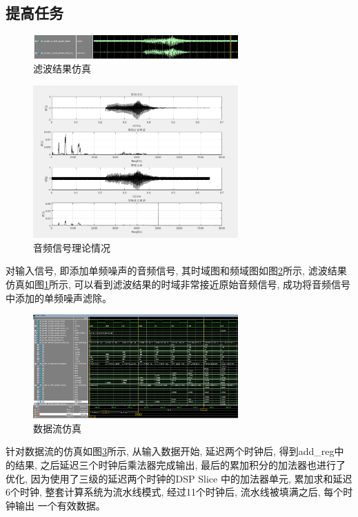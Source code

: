 \documentclass{article}
\begin{document}
\subsection*{提高任务}
\begin{figure}[H]
    \centering
    \includegraphics[width=0.7\textwidth]{image/2024-06-26-20-09-26.png}
    \caption{滤波结果仿真}
    \label{image_improve_sim_1_1}
\end{figure}
\begin{figure}[H]
    \centering
    \includegraphics[width=0.7\textwidth]{image/2024-06-26-20-11-58.png}
    \caption{音频信号理论情况}
    \label{image_improve_sim_1_2}
\end{figure}
对输入信号, 即添加单频噪声的音频信号, 其时域图和频域图如图\ref{image_improve_sim_1_2}所示, 
滤波结果仿真如图\ref{image_improve_sim_1_1}所示, 可以看到滤波结果的时域非常接近原始音频信号, 
成功将音频信号中添加的单频噪声滤除。
\begin{figure}[H]
    \centering
    \includegraphics[width=0.7\textwidth]{image/2024-06-26-20-38-56.png}
    \caption{数据流仿真}
    \label{image_improve_sim_2}
\end{figure}
针对数据流的仿真如图\ref{image_improve_sim_2}所示, 从输入数据开始, 延迟两个时钟后, 得到add\_reg中的结果, 
之后延迟三个时钟后乘法器完成输出, 最后的累加积分的加法器也进行了优化, 因为使用了三级的延迟两个时钟的DSP Slice
中的加法器单元, 累加求和延迟6个时钟, 整套计算系统为流水线模式, 经过11个时钟后, 流水线被填满之后, 每个时钟输出
一个有效数据。
\end{document}
